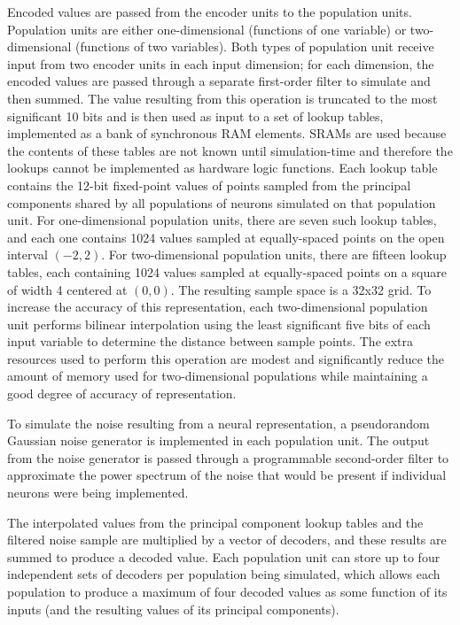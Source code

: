 \documentclass[english]{article}
\begin{document}
Encoded values are passed from the encoder units to the population units. Population units are either one-dimensional
(functions of one variable) or two-dimensional (functions of two variables).
Both types of population unit receive input from two encoder units in each input dimension;
for each dimension, the encoded values are passed through a separate first-order filter to simulate %
and then summed. The value resulting from this operation is
truncated to the most significant 10 bits and is then used as input to a set of lookup tables,
implemented as a bank of synchronous RAM elements. SRAMs are used
because the contents of these tables are not known until simulation-time and therefore the lookups cannot be implemented as hardware logic functions.
Each lookup table contains the 12-bit fixed-point values of points sampled from the principal components shared by all populations of neurons
simulated on that population unit. For one-dimensional population units, there are seven such lookup tables, and each one contains
1024 values sampled at equally-spaced points on the open interval $(-2, 2)$. For two-dimensional population units,
there are fifteen lookup tables, each containing 1024 values sampled at equally-spaced points on a square of width 4
centered at $(0, 0)$. The resulting sample space is a 32x32 grid.
To increase the accuracy of this representation, each two-dimensional population unit performs bilinear interpolation
using the least significant five bits of each input variable to determine the distance between sample points. 
The extra resources used to perform this operation are modest
and significantly reduce the amount of memory used for two-dimensional populations while maintaining a good degree of accuracy of representation.

To simulate the noise resulting from a neural representation, a pseudorandom Gaussian noise generator is implemented in each population unit.
The output from the noise generator is passed through a programmable second-order filter to approximate the power spectrum of the noise
that would be present if individual neurons were being implemented. %

The interpolated values from the principal component lookup tables and the filtered noise sample are multiplied by a vector of decoders,
and these results are summed to produce a decoded value. Each population unit can store up to four independent sets of decoders per population being simulated,
which allows each population to produce a maximum of four decoded values as some function of its inputs
(and the resulting values of its principal components).
\end{document}
